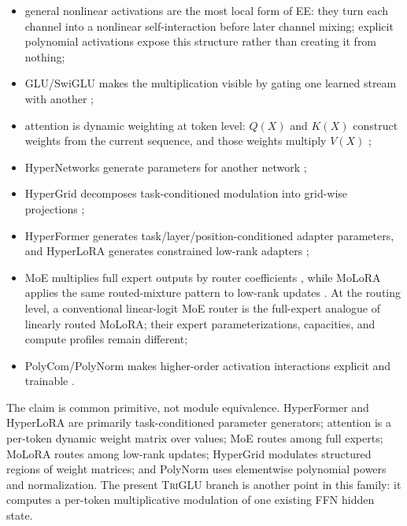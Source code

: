 \documentclass[10pt]{article}
\newcommand{\TriGLU}{\textsc{TriGLU}}
\begin{document}
\begin{itemize}
  \item general nonlinear activations are the most local form of EE: they turn
        each channel into a nonlinear self-interaction before later channel
        mixing; explicit polynomial activations expose this structure rather
        than creating it from nothing;
  \item GLU/SwiGLU makes the multiplication visible by gating one learned
        stream with another \citep{shazeer2020glu};
  \item attention is dynamic weighting at token level: $Q(X)$ and $K(X)$
        construct weights from the current sequence, and those weights
        multiply $V(X)$ \citep{vaswani2017attention};
  \item HyperNetworks generate parameters for another network
        \citep{ha2016hypernetworks};
  \item HyperGrid decomposes task-conditioned modulation into grid-wise
        projections \citep{tay2020hypergrid};
  \item HyperFormer generates task/layer/position-conditioned adapter
        parameters, and HyperLoRA generates constrained low-rank adapters
        \citep{mahabadi2021hyperformer,lv2024hyperlora};
  \item MoE multiplies full expert outputs by router coefficients
        \citep{shazeer2017moe}, while MoLoRA applies the same routed-mixture
        pattern to low-rank updates \citep{zadouri2024molora}.  At the routing
        level, a conventional linear-logit MoE router is the full-expert
        analogue of linearly routed MoLoRA; their expert parameterizations,
        capacities, and compute profiles remain different;
  \item PolyCom/PolyNorm makes higher-order activation interactions explicit
        and trainable \citep{zhuo2024polycom}.
\end{itemize}

The claim is common primitive, not module equivalence.  HyperFormer and
HyperLoRA are primarily task-conditioned parameter generators; attention is a
per-token dynamic weight matrix over values; MoE routes among full experts;
MoLoRA routes among low-rank updates; HyperGrid modulates structured regions of
weight matrices; and PolyNorm uses elementwise polynomial powers and
normalization.  The present \TriGLU{} branch is another point in this family:
it computes a per-token multiplicative modulation of one existing FFN hidden
state.
\end{document}
